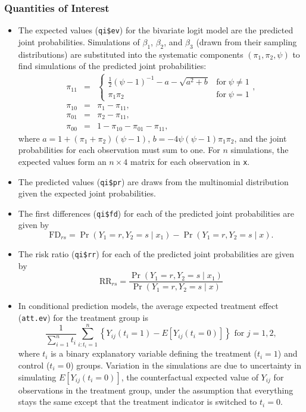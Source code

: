 \documentclass{article}
\begin{document}
\subsubsection{Quantities of Interest}
\begin{itemize}
\item The expected values ({\tt qi\$ev}) for the bivariate logit model
  are the predicted joint probabilities. Simulations of $\beta_1$,
  $\beta_2$, and $\beta_3$ (drawn from their sampling distributions)
  are substituted into the systematic components $(\pi_1, \pi_2,
  \psi)$ to find simulations of the predicted joint probabilities:
\begin{eqnarray*}
\pi_{11} & = & \left\{ \begin{array}{ll}
                 \frac{1}{2}(\psi - 1)^{-1} - {a - \sqrt{a^2 + b}} &
                 \textrm{for} \; \psi \ne 1 \\
                 \pi_1 \pi_2 & \textrm{for} \; \psi = 1 
                 \end{array} \right., \\
\pi_{10} &=& \pi_1 - \pi_{11}, \\
\pi_{01} &=& \pi_2 - \pi_{11}, \\
\pi_{00} &=& 1 - \pi_{10} - \pi_{01} - \pi_{11},
\end{eqnarray*}
where $a = 1 + (\pi_1 + \pi_2)(\psi - 1)$, $b = -4 \psi(\psi - 1)
\pi_1 \pi_2$, and the joint probabilities for each observation must sum
to one.  For $n$ simulations, the expected values form an $n \times 4$
matrix for each observation in {\tt x}.  

\item The predicted values ({\tt qi\$pr}) are draws from the
  multinomial distribution given the expected joint probabilities. 

\item The first differences ({\tt qi\$fd}) for each
  of the predicted joint probabilities are given by $$\textrm{FD}_{rs}
  = \Pr(Y_1=r, Y_2=s \mid x_1)-\Pr(Y_1=r, Y_2=s \mid x).$$  
  
\item The risk ratio ({\tt qi\$rr}) for each of the predicted joint
  probabilities are given by
\begin{equation*}
\textrm{RR}_{rs} = \frac{\Pr(Y_1=r, Y_2=s \mid x_1)}{\Pr(Y_1=r, Y_2=s \mid x)}
\end{equation*}

\item In conditional prediction models, the average expected treatment
  effect ({\tt att.ev}) for the treatment group is 
    \begin{equation*} \frac{1}{\sum_{i=1}^n t_i}\sum_{i:t_i=1}^n \left\{ Y_{ij}(t_i=1) -
      E[Y_{ij}(t_i=0)] \right\} \textrm{ for } j = 1,2,
    \end{equation*} 
    where $t_i$ is a binary explanatory variable defining the treatment
    ($t_i=1$) and control ($t_i=0$) groups.  Variation in the
    simulations are due to uncertainty in simulating $E[Y_{ij}(t_i=0)]$,
    the counterfactual expected value of $Y_{ij}$ for observations in the
    treatment group, under the assumption that everything stays the
    same except that the treatment indicator is switched to $t_i=0$.


\end{itemize}
\end{document}

